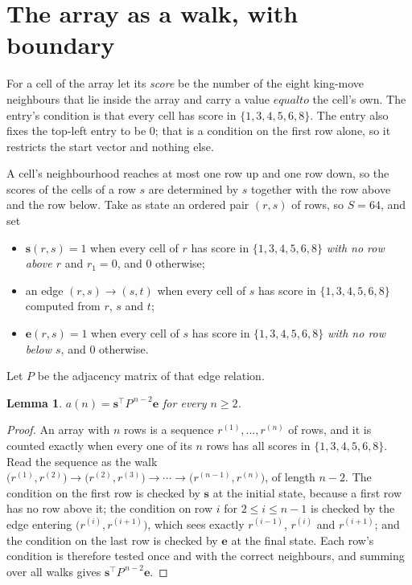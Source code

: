 \documentclass[11pt,a4paper]{article}
\theoremstyle{plain}
\newtheorem{lemma}[theorem]{Lemma}
\theoremstyle{definition}
\begin{document}
\section{The array as a walk, with boundary}

For a cell of the array let its \emph{score} be the number of the eight king-move neighbours that lie inside
the array and carry a value $equal to$ the cell's own. The entry's condition is that every cell
has score in $\{1,3,4,5,6,8\}$. The entry also fixes the top-left entry to be $0$; that is a condition on the first row alone, so it restricts the start vector and nothing else.

A cell's neighbourhood reaches at most one row up and one row down, so the scores of the
cells of a row $s$ are determined by $s$ together with the row above and the row below.
Take as state an ordered pair $(r,s)$ of rows, so $S=64$, and set
\begin{itemize}
\item $\mathbf{s}(r,s)=1$ when every cell of $r$ has score in $\{1,3,4,5,6,8\}$ \emph{with no row
above $r$} and $r_1=0$, and $0$ otherwise;
\item an edge $(r,s)\to(s,t)$ when every cell of $s$ has score in $\{1,3,4,5,6,8\}$ computed from
$r$, $s$ and $t$;
\item $\mathbf{e}(r,s)=1$ when every cell of $s$ has score in $\{1,3,4,5,6,8\}$ \emph{with no row
below $s$}, and $0$ otherwise.
\end{itemize}
Let $P$ be the adjacency matrix of that edge relation.

\begin{lemma}\label{lem:walk}
$a(n)=\mathbf{s}^{\!\top}P^{\,n-2}\mathbf{e}$ for every $n\ge2$.
\end{lemma}

\begin{proof}
An array with $n$ rows is a sequence $r^{(1)},\dots,r^{(n)}$ of rows, and it is counted
exactly when every one of its $n$ rows has all scores in $\{1,3,4,5,6,8\}$. Read the sequence as the
walk $\bigl(r^{(1)},r^{(2)}\bigr)\to\bigl(r^{(2)},r^{(3)}\bigr)\to\cdots\to
\bigl(r^{(n-1)},r^{(n)}\bigr)$, of length $n-2$. The condition on the first row is
checked by $\mathbf{s}$ at the initial state, because a first row has no row above it; the
condition on row $i$ for $2\le i\le n-1$ is checked by the edge entering
$\bigl(r^{(i)},r^{(i+1)}\bigr)$, which sees exactly $r^{(i-1)}$, $r^{(i)}$ and
$r^{(i+1)}$; and the condition on the last row is checked by $\mathbf{e}$ at the final
state. Each row's condition is therefore tested once and with the correct neighbours, and
summing over all walks gives $\mathbf{s}^{\!\top}P^{\,n-2}\mathbf{e}$.
\end{proof}
\end{document}
